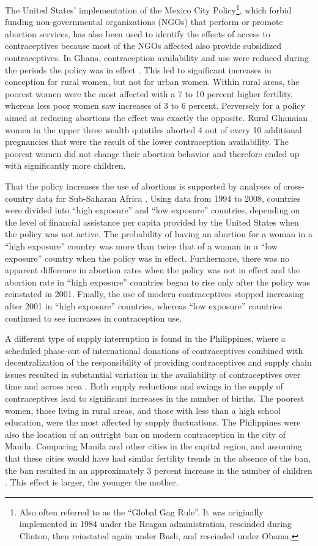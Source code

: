 The United States' implementation of the Mexico City Policy\footnote{Also often referred to as the ``Global Gag Rule''. It was originally implemented in 1984 under the Reagan administration, rescinded during Clinton, then reinstated again under Bush, and rescinded under Obama.}, which forbid funding non-governmental organizations (NGOs) that perform or promote abortion services, has also been used to identify the effects of access to contraceptives because most of the NGOs affected also provide subsidized contraceptives. In Ghana, contraception availability and use were reduced during the periods the policy was in effect \citep{Jones2015}. This led to significant increases in conception for rural women, but not for urban women. Within rural areas, the poorest women were the most affected with a 7 to 10 percent higher fertility, whereas less poor women saw increases of 3 to 6 percent. Perversely for a policy aimed at reducing abortions the effect was exactly the opposite. Rural Ghanaian women in the upper three wealth quintiles aborted 4 out of every 10 additional pregnancies that were the result of the lower contraception availability. The poorest women did not change their abortion behavior and therefore ended up with significantly more children.

That the policy increases the use of abortions is supported by analyses of cross-country data for Sub-Saharan Africa \citep{Bendavid2011}. Using data from 1994 to 2008, countries were divided into ``high exposure'' and ``low exposure'' countries, depending on the level of financial assistance per capita provided by the United States when the policy was not active. The probability of having an abortion for a woman in a ``high exposure'' country was more than twice that of a woman in a ``low exposure'' country when the policy was in effect. Furthermore, there was no apparent difference in abortion rates when the policy was not in effect and the abortion rate in ``high exposure'' countries began to rise only after the policy was reinstated in 2001. Finally, the use of modern contraceptives stopped increasing after 2001 in ``high exposure'' countries, whereas ``low exposure'' countries continued to see increases in contraception use.

A different type of supply interruption is found in the Philippines, where a scheduled phase-out of international donations of contraceptives combined with decentralization of the responsibility of providing contraceptives and supply chain issues resulted in substantial variation in the availability of contraceptives over time and across area \citep{Salas2014}. Both supply reductions and swings in the supply of contraceptives lead to significant increases in the number of births. The poorest women, those living in rural areas, and those with less than a high school education, were the most affected by supply fluctuations. The Philippines were also the location of an outright ban on modern contraception in the city of Manila. Comparing Manila and other cities in the capital region, and assuming that these cities would have had similar fertility trends in the absence of the ban, the ban resulted in an approximately 3 percent increase in the number of children \citep{Dumas2017}. This effect is larger, the younger the mother.

